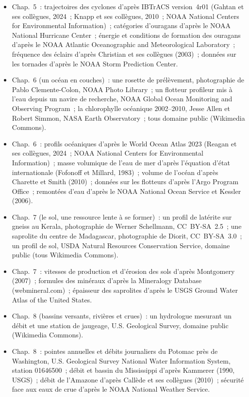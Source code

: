 \begin{itemize}
  \item Chap.~5~: trajectoires des cyclones d'après IBTrACS version~4r01 (Gahtan et ses collègues, 2024~; Knapp et ses collègues, 2010~; NOAA National Centers for Environmental Information)~; catégories d'ouragans d'après le NOAA National Hurricane Center~; énergie et conditions de formation des ouragans d'après le NOAA Atlantic Oceanographic and Meteorological Laboratory~; fréquence des éclairs d'après Christian et ses collègues (2003)~; données sur les tornades d'après le NOAA Storm Prediction Center.
  \item Chap.~6 (un océan en couches)~: une rosette de prélèvement, photographie de Pablo Clemente-Colon, NOAA Photo Library~; un flotteur profileur mis à l'eau depuis un navire de recherche, NOAA Global Ocean Monitoring and Observing Program~; la chlorophylle océanique 2002--2010, Jesse Allen et Robert Simmon, NASA Earth Observatory~; tous domaine public (Wikimedia Commons).
  \item Chap.~6~: profils océaniques d'après le World Ocean Atlas 2023 (Reagan et ses collègues, 2024~; NOAA National Centers for Environmental Information)~; masse volumique de l'eau de mer d'après l'équation d'état internationale (Fofonoff et Millard, 1983)~; volume de l'océan d'après Charette et Smith (2010)~; données sur les flotteurs d'après l'Argo Program Office~; remontées d'eau d'après le NOAA National Ocean Service et Kessler (2006).
  \item Chap.~7 (le sol, une ressource lente à se former)~: un profil de latérite sur gneiss au Kerala, photographie de Werner Schellmann, CC~BY-SA~2.5~; une saprolite du centre de Madagascar, photographie de Diorit, CC~BY-SA~3.0~; un profil de sol, USDA Natural Resources Conservation Service, domaine public (tous Wikimedia Commons).
  \item Chap.~7~: vitesses de production et d'érosion des sols d'après Montgomery (2007)~; formules des minéraux d'après la Mineralogy Database (webmineral.com)~; épaisseur des saprolites d'après le USGS Ground Water Atlas of the United States.
  \item Chap.~8 (bassins versants, rivières et crues)~: un hydrologue mesurant un débit et une station de jaugeage, U.S. Geological Survey, domaine public (Wikimedia Commons).
  \item Chap.~8~: pointes annuelles et débits journaliers du Potomac près de Washington, U.S. Geological Survey National Water Information System, station 01646500~; débit et bassin du Mississippi d'après Kammerer (1990, USGS)~; débit de l'Amazone d'après Callède et ses collègues (2010)~; sécurité face aux eaux de crue d'après le NOAA National Weather Service.

\end{itemize}
